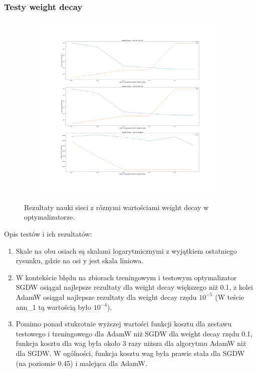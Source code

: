 \documentclass[12pt]{article}
\begin{document}
\subsubsection{Testy weight decay}
\begin{figure}[H]
	\centering
	\begin{subfigure}[b]{1\linewidth}
		\includegraphics[width=\linewidth]{Comparision_weight_decay_ann_0.png}
	\end{subfigure}
	\label{fig:decay}
	\caption{Rezultaty nauki sieci z róznymi wartościami weight decay w optymalizatorze.}
\end{figure}
Opis testów i ich rezultatów:
\begin{enumerate}
	\item Skale na obu osiach są skalami logarytmicznymi z wyjątkiem ostatniego rysunku, gdzie na osi y jest skala liniowa.
	\item W kontekście błędu na zbiorach treningowym i testowym optymalizator SGDW osiągał najlepsze rezultaty dla weight decay większego niż 0.1, z kolei AdamW osiągał najlepsze rezultaty dla weight decay rzędu \(10^{-5}\) (W teście ann\_1 tą wartością było $10^{-4}$).
	\item Pomimo ponad stukrotnie wyższej wartości funkcji kosztu dla zestawu testowego i treningowego dla AdamW niż SGDW dla weight decay rzędu 0.1, funkcja kosztu dla wag była około 3 razy niższa dla algorytmu AdamW niż dla SGDW. W ogólności, funkcja kosztu wag była prawie stała dla SGDW (na poziomie 0.45) i malejąca dla AdamW.
\end{enumerate}
\end{document}
